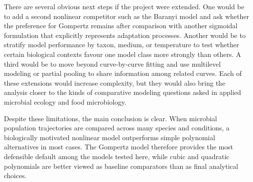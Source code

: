 \documentclass[11pt]{article}
\begin{document}
There are several obvious next steps if the project were extended. One would be to add a second nonlinear competitor such as the Baranyi model and ask whether the preference for Gompertz remains after comparison with another sigmoidal formulation that explicitly represents adaptation processes. Another would be to stratify model performance by taxon, medium, or temperature to test whether certain biological contexts favour one model class more strongly than others. A third would be to move beyond curve-by-curve fitting and use multilevel modeling or partial pooling to share information among related curves. Each of these extensions would increase complexity, but they would also bring the analysis closer to the kinds of comparative modeling questions asked in applied microbial ecology and food microbiology.

Despite these limitations, the main conclusion is clear. When microbial population trajectories are compared across many species and conditions, a biologically motivated nonlinear model outperforms simple polynomial alternatives in most cases. The Gompertz model therefore provides the most defensible default among the models tested here, while cubic and quadratic polynomials are better viewed as baseline comparators than as final analytical choices.



\end{document}
